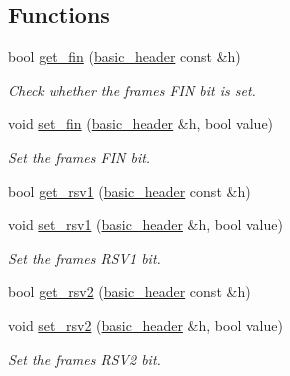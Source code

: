 \subsection*{Functions}
\begin{DoxyCompactItemize}
\item 
bool \hyperlink{namespacewebsocketpp_1_1frame_a66b39e273681d8509128e420cfaef6b0}{get\+\_\+fin} (\hyperlink{structwebsocketpp_1_1frame_1_1basic__header}{basic\+\_\+header} const \&h)
\begin{DoxyCompactList}\small\item\em Check whether the frame\textquotesingle{}s F\+I\+N bit is set. \end{DoxyCompactList}\item 
void \hyperlink{namespacewebsocketpp_1_1frame_abe746242507916e5d6ae2ca26bd9f69e}{set\+\_\+fin} (\hyperlink{structwebsocketpp_1_1frame_1_1basic__header}{basic\+\_\+header} \&h, bool value)
\begin{DoxyCompactList}\small\item\em Set the frame\textquotesingle{}s F\+I\+N bit. \end{DoxyCompactList}\item 
bool \hyperlink{namespacewebsocketpp_1_1frame_af8b4992f23ff5c43b907fa2edb44b80c}{get\+\_\+rsv1} (\hyperlink{structwebsocketpp_1_1frame_1_1basic__header}{basic\+\_\+header} const \&h)
\item 
void \hyperlink{namespacewebsocketpp_1_1frame_ab706b1d5ef7de377671547993eb35062}{set\+\_\+rsv1} (\hyperlink{structwebsocketpp_1_1frame_1_1basic__header}{basic\+\_\+header} \&h, bool value)
\begin{DoxyCompactList}\small\item\em Set the frame\textquotesingle{}s R\+S\+V1 bit. \end{DoxyCompactList}\item 
bool \hyperlink{namespacewebsocketpp_1_1frame_a76d62b4e036b5efb968ae827542872f8}{get\+\_\+rsv2} (\hyperlink{structwebsocketpp_1_1frame_1_1basic__header}{basic\+\_\+header} const \&h)
\item 
void \hyperlink{namespacewebsocketpp_1_1frame_a0c97068961b3b3d2e1b83a9bd273c5cf}{set\+\_\+rsv2} (\hyperlink{structwebsocketpp_1_1frame_1_1basic__header}{basic\+\_\+header} \&h, bool value)
\begin{DoxyCompactList}\small\item\em Set the frame\textquotesingle{}s R\+S\+V2 bit. \end{DoxyCompactList}\item 

\end{DoxyCompactItemize}
